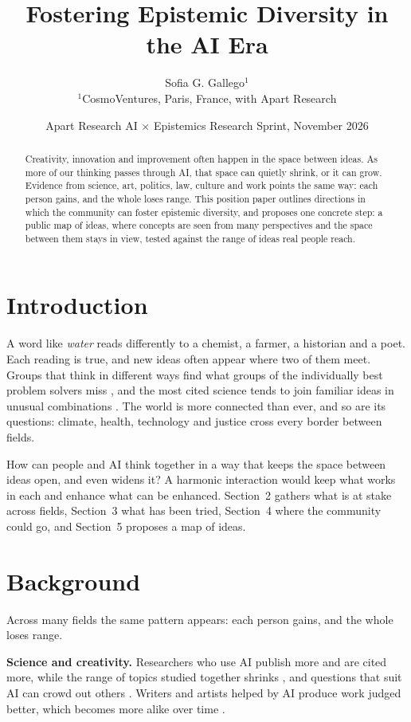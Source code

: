 \documentclass[11pt]{article}
\title{\textbf{Fostering Epistemic Diversity in the AI Era}}
\author{
Sofia G. Gallego$^{1}$ \\[4pt]
\normalsize $^1$CosmoVentures, Paris, France, with Apart Research
}
\date{Apart Research AI $\times$ Epistemics Research Sprint, November 2026}
\begin{document}
\maketitle

\begin{abstract}
Creativity, innovation and improvement often happen in the space between ideas. As more of our thinking passes through AI, that space can quietly shrink, or it can grow. Evidence from science, art, politics, law, culture and work points the same way: each person gains, and the whole loses range. This position paper outlines directions in which the community can foster epistemic diversity, and proposes one concrete step: a public map of ideas, where concepts are seen from many perspectives and the space between them stays in view, tested against the range of ideas real people reach.
\end{abstract}

\section{Introduction}

A word like \emph{water} reads differently to a chemist, a farmer, a historian and a poet. Each reading is true, and new ideas often appear where two of them meet. Groups that think in different ways find what groups of the individually best problem solvers miss \citep{hong2004}, and the most cited science tends to join familiar ideas in unusual combinations \citep{uzzi2013}. The world is more connected than ever, and so are its questions: climate, health, technology and justice cross every border between fields.

How can people and AI think together in a way that keeps the space between ideas open, and even widens it? A harmonic interaction would keep what works in each and enhance what can be enhanced. Section~2 gathers what is at stake across fields, Section~3 what has been tried, Section~4 where the community could go, and Section~5 proposes a map of ideas.

\section{Background}

Across many fields the same pattern appears: each person gains, and the whole loses range.

\textbf{Science and creativity.} Researchers who use AI publish more and are cited more, while the range of topics studied together shrinks \citep{hao2026}, and questions that suit AI can crowd out others \citep{messeri2024}. Writers and artists helped by AI produce work judged better, which becomes more alike over time \citep{doshi2024,zhou2024,anderson2024}.
\end{document}
